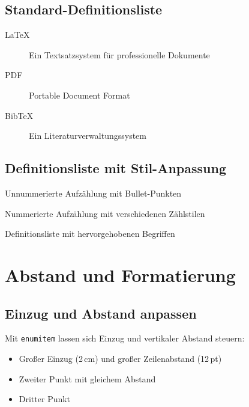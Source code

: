 \section{Standard-Definitionsliste}

\begin{description}
    \item[\LaTeX] Ein Textsatzsystem für professionelle Dokumente
    \item[PDF] Portable Document Format
    \item[Bib\TeX] Ein Literaturverwaltungssystem
\end{description}

\section{Definitionsliste mit Stil-Anpassung}

\begin{description}[style=nextline]
    \item[Itemize] Unnummerierte Aufzählung mit Bullet-Punkten
    \item[Enumerate] Nummerierte Aufzählung mit verschiedenen Zählstilen
    \item[Description] Definitionsliste mit hervorgehobenen Begriffen
\end{description}

\chapter{Abstand und Formatierung}
\label{sec:abstand}

\section{Einzug und Abstand anpassen}

Mit \texttt{enumitem}\cite{mittelbach2004} lassen sich Einzug und vertikaler Abstand steuern:

\begin{itemize}[leftmargin=2cm, itemsep=12pt]
    \item Großer Einzug (2\,cm) und großer Zeilenabstand (12\,pt)
    \item Zweiter Punkt mit gleichem Abstand
    \item Dritter Punkt
\end{itemize}

